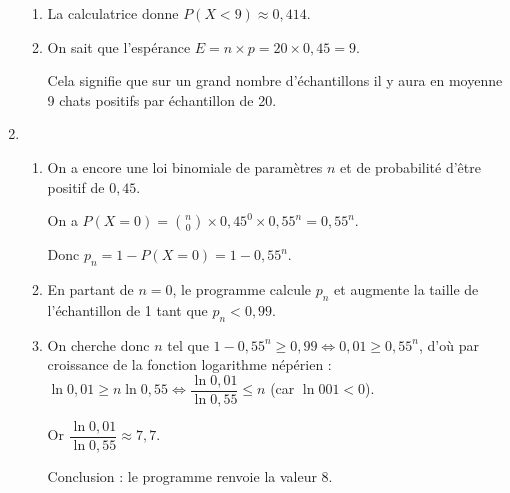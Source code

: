 \begin{enumerate}
\begin{enumerate}
		\item %
La calculatrice donne $P(X < 9) \approx 0,414$.
		\item %
On sait que l'espérance $E = n \times p = 20 \times 0,45 = 9$.
		
Cela signifie que sur un grand nombre d'échantillons il y aura en moyenne 9 chats positifs par échantillon de 20.
	\end{enumerate}		
\item %
	\begin{enumerate}
		\item %
On a encore une loi binomiale de paramètres $n$ et de probabilité d'être positif de $0,45$.

On a $P(X = 0) = \binom{n}{0}\times 0,45^0 \times 0,55^n = 0,55^n$.

Donc $p_n = 1 - P(X = 0) =  1 - 0,55^n$.
		\item
En partant de $n=0$, le programme calcule $p_n$ et augmente la taille de l'échantillon de 1 tant que $p_n < 0,99$.

		\item %
		On cherche donc $n$ tel que $1 - 0,55^n \geqslant 0,99 \iff 0,01 \geqslant 0,55^n$, d'où par croissance de la fonction logarithme népérien : $\ln 0,01 \geqslant n \ln 0,55 \iff \dfrac{\ln 0,01}{\ln 0,55} \leqslant n$ (car $\ln 001 < 0$).
		
		Or $\dfrac{\ln 0,01}{\ln 0,55} \approx 7,7$.
		
Conclusion : le programme renvoie la valeur 8.
	\end{enumerate}
\end{enumerate}

\bigskip

